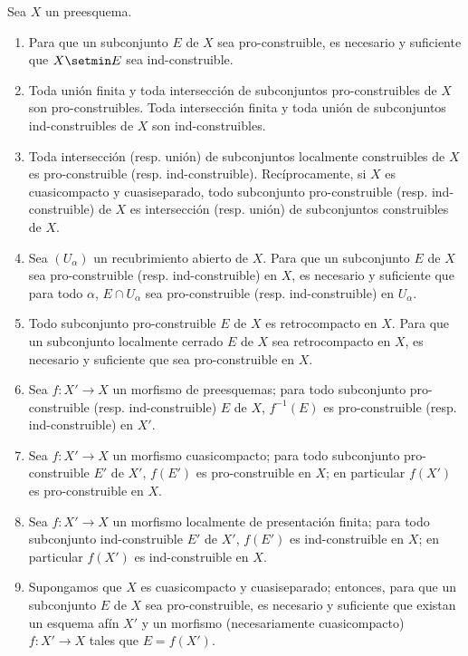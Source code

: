 \begin{proposition}[1.9.5]
\label{IV.1.9.5-fr}
Sea $X$ un preesquema.
\begin{enumerate}
  \item[\textup{(i)}] Para que un subconjunto $E$ de $X$ sea pro-construible, es necesario y
  suficiente que $X\setmin E$ sea ind-construible.
  \item[\textup{(ii)}] Toda unión finita y toda intersección de subconjuntos
  pro-construibles de $X$ son pro-construibles. Toda intersección
  finita y toda unión de subconjuntos ind-construibles de $X$ son
  ind-construibles.
  \item[\textup{(iii)}] Toda intersección \textup{(resp.} unión\textup{)} de subconjuntos localmente
  construibles de $X$ es pro-construible \textup{(resp.} ind-construible\textup{)}.
  Recíprocamente, si $X$ es cuasicompacto y cuasiseparado, todo subconjunto
  pro-construible \textup{(resp.} ind-construible\textup{)} de $X$ es intersección \textup{(resp.}
  unión\textup{)} de subconjuntos construibles de $X$.
  \item[\textup{(iv)}] Sea $(U_\alpha)$ un recubrimiento abierto de $X$. Para que un
  subconjunto $E$ de $X$ sea pro-construible \textup{(resp.} ind-construible\textup{)} en
  $X$, es necesario y suficiente que para todo $\alpha$, $E\cap U_\alpha$ sea
  pro-construible \textup{(resp.} ind-construible\textup{)} en $U_\alpha$.
  \item[\textup{(v)}] Todo subconjunto pro-construible $E$ de $X$ es retrocompacto
  en $X$. Para que un subconjunto localmente cerrado $E$ de $X$ sea
  retrocompacto en $X$, es necesario y suficiente que sea
  pro-construible en $X$.
  \item[\textup{(vi)}] Sea $f:X'\to X$ un morfismo de preesquemas; para todo subconjunto
  pro-construible \textup{(resp.} ind-construible\textup{)} $E$ de $X$, $f^{-1}(E)$ es
  pro-construible \textup{(resp.} ind-construible\textup{)} en $X'$.
  \item[\textup{(vii)}] Sea $f:X'\to X$ un morfismo cuasicompacto; para todo
  subconjunto pro-construible $E'$ de $X'$, $f(E')$ es pro-construible en
  $X$; en particular $f(X')$ es pro-construible en $X$.
  \item[\textup{(viii)}] Sea $f:X'\to X$ un morfismo localmente de presentación
  finita; para todo subconjunto ind-construible $E'$ de $X'$, $f(E')$ es
  ind-construible en $X$; en particular $f(X')$ es ind-construible
  en $X$.
  \item[\textup{(ix)}] Supongamos que $X$ es cuasicompacto y cuasiseparado; entonces,
  para que un subconjunto $E$ de $X$ sea pro-construible, es necesario y suficiente
  que existan un esquema afín $X'$ y un morfismo (necesariamente
  cuasicompacto) $f:X'\to X$ tales que $E=f(X')$.
\end{enumerate}
\end{proposition}


